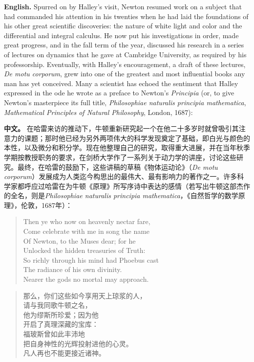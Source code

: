 \noindent\textbf{English.} Spurred on by Halley's visit, Newton resumed work on a subject that had commanded his attention in his twenties when he had laid the foundations of his other great scientific discoveries: the nature of white light and color and the differential and integral calculus. He now put his investigations in order, made great progress, and in the fall term of the year, discussed his research in a series of lectures on dynamics that he gave at Cambridge University, as required by his professorship. Eventually, with Halley's encouragement, a draft of these lectures, \emph{De motu corporum}, grew into one of the greatest and most influential books any man has yet conceived. Many a scientist has echoed the sentiment that Halley expressed in the ode he wrote as a preface to Newton's \emph{Principia} (or, to give Newton's masterpiece its full title, \emph{Philosophiae naturalis principia mathematica}, \emph{Mathematical Principles of Natural Philosophy}, London, 1687):
\par\noindent\textbf{中文。} 在哈雷来访的推动下，牛顿重新研究起一个在他二十多岁时就曾吸引其注意力的课题；那时他已经为另外两项伟大的科学发现奠定了基础，即白光与颜色的本性，以及微分和积分学。现在他整理自己的研究，取得重大进展，并在当年秋季学期按教授职务的要求，在剑桥大学作了一系列关于动力学的讲座，讨论这些研究。最终，在哈雷的鼓励下，这些讲稿的草稿《物体运动论》（\emph{De motu corporum}）发展成为人类迄今构思出的最伟大、最有影响力的著作之一。许多科学家都呼应过哈雷在为牛顿《原理》所写序诗中表达的感情（若写出牛顿这部杰作的全名，则是\emph{Philosophiae naturalis principia mathematica}，《自然哲学的数学原理》，伦敦，1687年）：
\medskip

\begin{verse}
Then ye who now on heavenly nectar fare,\\
Come celebrate with me in song the name\\
Of Newton, to the Muses dear; for he\\
Unlocked the hidden treasuries of Truth:\\
So richly through his mind had Phoebus cast\\
The radiance of his own divinity.\\
Nearer the gods no mortal may approach.
\end{verse}

\begin{verse}
那么，你们这些如今享用天上琼浆的人，\\
请与我同歌牛顿之名，\\
他为缪斯所珍爱；因为他\\
开启了真理深藏的宝库：\\
福玻斯曾如此丰沛地\\
把自身神性的光辉投射进他的心灵。\\
凡人再也不能更接近诸神。
\end{verse}

